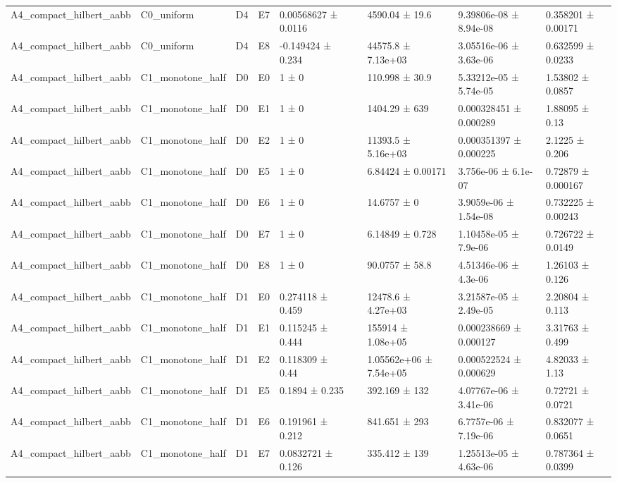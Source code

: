 \begin{table}
\begin{tabular}{lllllllll}
A4\_compact\_hilbert\_aabb & C0\_uniform & D4 & E7 & 0.00568627 ± 0.0116 &  & 4590.04 ± 19.6 & 9.39806e-08 ± 8.94e-08 & 0.358201 ± 0.00171 \\
A4\_compact\_hilbert\_aabb & C0\_uniform & D4 & E8 & -0.149424 ± 0.234 &  & 44575.8 ± 7.13e+03 & 3.05516e-06 ± 3.63e-06 & 0.632599 ± 0.0233 \\
A4\_compact\_hilbert\_aabb & C1\_monotone\_half & D0 & E0 & 1 ± 0 &  & 110.998 ± 30.9 & 5.33212e-05 ± 5.74e-05 & 1.53802 ± 0.0857 \\
A4\_compact\_hilbert\_aabb & C1\_monotone\_half & D0 & E1 & 1 ± 0 &  & 1404.29 ± 639 & 0.000328451 ± 0.000289 & 1.88095 ± 0.13 \\
A4\_compact\_hilbert\_aabb & C1\_monotone\_half & D0 & E2 & 1 ± 0 &  & 11393.5 ± 5.16e+03 & 0.000351397 ± 0.000225 & 2.1225 ± 0.206 \\
A4\_compact\_hilbert\_aabb & C1\_monotone\_half & D0 & E5 & 1 ± 0 &  & 6.84424 ± 0.00171 & 3.756e-06 ± 6.1e-07 & 0.72879 ± 0.000167 \\
A4\_compact\_hilbert\_aabb & C1\_monotone\_half & D0 & E6 & 1 ± 0 &  & 14.6757 ± 0 & 3.9059e-06 ± 1.54e-08 & 0.732225 ± 0.00243 \\
A4\_compact\_hilbert\_aabb & C1\_monotone\_half & D0 & E7 & 1 ± 0 &  & 6.14849 ± 0.728 & 1.10458e-05 ± 7.9e-06 & 0.726722 ± 0.0149 \\
A4\_compact\_hilbert\_aabb & C1\_monotone\_half & D0 & E8 & 1 ± 0 &  & 90.0757 ± 58.8 & 4.51346e-06 ± 4.3e-06 & 1.26103 ± 0.126 \\
A4\_compact\_hilbert\_aabb & C1\_monotone\_half & D1 & E0 & 0.274118 ± 0.459 &  & 12478.6 ± 4.27e+03 & 3.21587e-05 ± 2.49e-05 & 2.20804 ± 0.113 \\
A4\_compact\_hilbert\_aabb & C1\_monotone\_half & D1 & E1 & 0.115245 ± 0.444 &  & 155914 ± 1.08e+05 & 0.000238669 ± 0.000127 & 3.31763 ± 0.499 \\
A4\_compact\_hilbert\_aabb & C1\_monotone\_half & D1 & E2 & 0.118309 ± 0.44 &  & 1.05562e+06 ± 7.54e+05 & 0.000522524 ± 0.000629 & 4.82033 ± 1.13 \\
A4\_compact\_hilbert\_aabb & C1\_monotone\_half & D1 & E5 & 0.1894 ± 0.235 &  & 392.169 ± 132 & 4.07767e-06 ± 3.41e-06 & 0.72721 ± 0.0721 \\
A4\_compact\_hilbert\_aabb & C1\_monotone\_half & D1 & E6 & 0.191961 ± 0.212 &  & 841.651 ± 293 & 6.7757e-06 ± 7.19e-06 & 0.832077 ± 0.0651 \\
A4\_compact\_hilbert\_aabb & C1\_monotone\_half & D1 & E7 & 0.0832721 ± 0.126 &  & 335.412 ± 139 & 1.25513e-05 ± 4.63e-06 & 0.787364 ± 0.0399 \\

\end{tabular}
\end{table}
